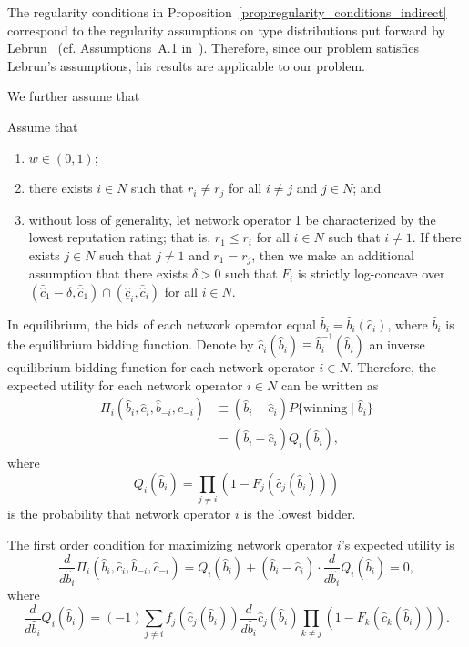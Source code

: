 The regularity conditions in Proposition~\ref{prop:regularity_conditions_indirect} correspond to the regularity assumptions on type distributions put forward by Lebrun~\cite{Lebrun2006} (cf. Assumptions~A.1 in~\cite{Lebrun2006}). Therefore, since our problem satisfies Lebrun's assumptions, his results are applicable to our problem.

We further assume that
\begin{assumptions}
\label{ass:assumptions_generic_indirect}
Assume that
\begin{enumerate}
  \item $w\in(0,1)$;
  \item there exists $i\in N$ such that $r_i\neq r_j$ for all $i\neq j$ and $j\in N$; and
  \item without loss of generality, let network operator 1 be characterized by the lowest reputation rating; that is, $r_1 \leq r_i$ for all $i\in N$ such that $i\neq 1$. If there exists $j\in N$ such that $j\neq 1$ and $r_1 = r_j$, then we make an additional assumption that there exists $\delta > 0$ such that $F_i$ is strictly log-concave over $(\bar{\hat{c}}_1 - \delta, \bar{\hat{c}}_1)\cap (\underline{\hat{c}}_i, \bar{\hat{c}}_i)$ for all $i\in N$.
\end{enumerate}
\end{assumptions}

In equilibrium, the bids of each network operator equal $\hat{b}_i = \hat{b}_i(\hat{c}_i)$, where $\hat{b}_i$ is the equilibrium bidding function. Denote by $\hat{c}_i(\hat{b}_i)\equiv \hat{b}_i^{-1}(\hat{b}_i)$ an inverse equilibrium bidding function for each network operator $i\in N$. Therefore, the expected utility for each network operator $i\in N$ can be written as
\begin{align}
  \label{eq:def_expected_utility_indirect}
  \Pi_i(\hat{b}_i,\hat{c}_i,\hat{b}_{-i},\hat{c}_{-i})
  &\equiv (\hat{b}_i - \hat{c}_i)P\{\textrm{winning}\mid\hat{b}_i\}\\ \nonumber
  &= (\hat{b}_i - \hat{c}_i)Q_i(\hat{b}_i),
\end{align}
where
\begin{equation*}
Q_i(\hat{b}_i) = \prod_{j\neq i}\left( 1 - F_j(\hat{c}_j(\hat{b}_i)) \right)
\end{equation*}
is the probability that network operator $i$ is the lowest bidder.

The first order condition for maximizing network operator $i$'s expected utility is
\begin{equation}
  \label{eq:foc_indirect}
  \frac{d}{d\hat{b}_i}\Pi_i(\hat{b}_i,\hat{c}_i,\hat{b}_{-i},\hat{c}_{-i}) = Q_i(\hat{b}_i) + (\hat{b}_i - \hat{c}_i)\cdot\frac{d}{d\hat{b}_i}Q_i(\hat{b}_i) = 0,
\end{equation}
where
\begin{equation*}
  \frac{d}{d\hat{b}_i}Q_i(\hat{b}_i) = (-1)\sum_{j\neq i} f_j(\hat{c}_j(\hat{b}_i))\frac{d}{d\hat{b}_i}\hat{c}_j(\hat{b}_i)\prod_{k\neq j} \left( 1 - F_k(\hat{c}_k(\hat{b}_i)) \right).
\end{equation*}


